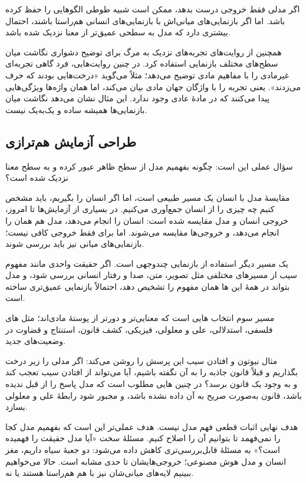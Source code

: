اگر مدلی فقط خروجی درست بدهد، ممکن است شبیه طوطی الگوهایی را حفظ کرده باشد. اما اگر بازنمایی‌های میانی‌اش با بازنمایی‌های انسانی هم‌راستا باشند، احتمال بیشتری دارد که مدل به سطحی عمیق‌تر از معنا نزدیک شده باشد.

همچنین از روایت‌های تجربه‌های نزدیک به مرگ برای توضیح دشواری نگاشت میان سطح‌های مختلف بازنمایی استفاده کرد. در چنین روایت‌هایی، فرد گاهی تجربه‌ای غیرمادی را با مفاهیم مادی توضیح می‌دهد؛ مثلاً می‌گوید «درخت‌هایی بودند که حرف می‌زدند». یعنی تجربه را با واژگان جهان مادی بیان می‌کند، اما همان واژه‌ها ویژگی‌هایی پیدا می‌کنند که در مادهٔ عادی وجود ندارد. این مثال نشان می‌دهد نگاشت میان بازنمایی‌ها همیشه ساده و یک‌به‌یک نیست.

\subsection{طراحی آزمایش هم‌ترازی}
سؤال عملی این است: چگونه بفهمیم مدل از سطح ظاهر عبور کرده و به سطح معنا نزدیک شده است؟

مقایسهٔ مدل با انسان یک مسیر طبیعی است، اما اگر انسان را  بگیریم، باید مشخص کنیم چه چیزی را از انسان جمع‌آوری می‌کنیم. در بسیاری از آزمایش‌ها تا امروز، خروجی انسان و مدل مقایسه شده است: انسان  را انجام می‌دهد، مدل هم همان  را انجام می‌دهد، و خروجی‌ها مقایسه می‌شوند. اما برای  فقط خروجی کافی نیست؛ بازنمایی‌های میانی نیز باید بررسی شوند.

یک مسیر دیگر استفاده از بازنمایی چندوجهی است. اگر حقیقت واحدی مانند مفهوم سیب از مسیرهای مختلفی مثل تصویر، متن، صدا و رفتار انسانی بررسی شود، و مدل بتواند در همهٔ این ها همان مفهوم را تشخیص دهد، احتمالاً بازنمایی عمیق‌تری ساخته است.

مسیر سوم انتخاب هایی است که معنایی‌تر و دورتر از پوستهٔ مادی‌اند؛ مثل های فلسفی، استدلالی، علی و معلولی، فیزیکی، کشف قانون، استنتاج و قضاوت در وضعیت‌های جدید.

مثال نیوتون و افتادن سیب این پرسش را روشن می‌کند: اگر مدلی را زیر درخت بگذاریم و قبلاً قانون جاذبه را به آن نگفته باشیم، آیا می‌تواند از افتادن سیب تعجب کند و به وجود یک قانون برسد؟ در چنین هایی مطلوب است که مدل پاسخ را از قبل ندیده باشد، قانون به‌صورت صریح به آن داده نشده باشد، و مجبور شود رابطهٔ علی و معلولی بسازد.

هدف نهایی  اثبات قطعی فهم مدل نیست. هدف عملی‌تر این است که بفهمیم مدل کجا را نمی‌فهمد تا بتوانیم آن را اصلاح کنیم. مسئلهٔ سخت «آیا مدل حقیقت را فهمیده است؟» به مسئلهٔ قابل‌بررسی‌تری کاهش داده می‌شود: دو جعبهٔ سیاه داریم، مغز انسان و مدل هوش مصنوعی؛ خروجی‌هایشان تا حدی مشابه است. حالا می‌خواهیم ببینیم لایه‌های میانی‌شان نیز با هم هم‌راستا هستند یا نه.

